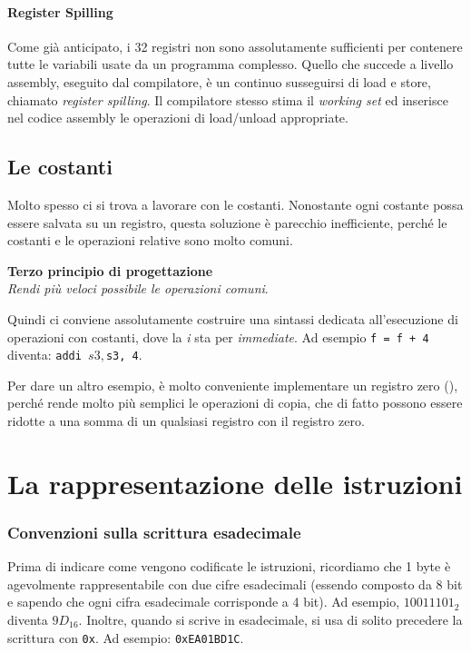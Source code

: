 \paragraph{Register Spilling}
Come già anticipato, i 32 registri non sono assolutamente sufficienti per contenere tutte le variabili usate da un programma complesso. Quello che succede a livello assembly, eseguito dal compilatore, è un continuo susseguirsi di load e store, chiamato \emph{register spilling}. Il compilatore stesso stima il \emph{working set} ed inserisce nel codice assembly le operazioni di load/unload appropriate.

\subsection*{Le costanti}
Molto spesso ci si trova a lavorare con le costanti. Nonostante ogni costante possa essere salvata su un registro, questa soluzione è parecchio inefficiente, perché le costanti e le operazioni relative sono molto comuni.

\vspace{8pt}
\begin{tcolorbox}
\centering
\textbf{Terzo principio di progettazione}\\
\emph{Rendi più veloci possibile le operazioni comuni}.
\end{tcolorbox}
\vspace{5pt}

Quindi ci conviene assolutamente costruire una sintassi dedicata all'esecuzione di operazioni con costanti, dove la \emph{i} sta per \emph{immediate}. Ad esempio \texttt{f = f + 4} diventa: \texttt{addi $s3, $s3, 4}.

Per dare un altro esempio, è molto conveniente implementare un registro zero (), perché rende molto più semplici le operazioni di copia, che di fatto possono essere ridotte a una somma di un qualsiasi registro con il registro zero.

\section{La rappresentazione delle istruzioni}

\subsubsection{Convenzioni sulla scrittura esadecimale}
Prima di indicare come vengono codificate le istruzioni, ricordiamo che 1 byte è agevolmente rappresentabile con due cifre esadecimali (essendo composto da 8 bit e sapendo che ogni cifra esadecimale corrisponde a 4 bit). Ad esempio, \(1001 1101_{2}\) diventa \(9D_{16}\). Inoltre, quando si scrive in esadecimale, si usa di solito precedere la scrittura con \texttt{0x}. Ad esempio: \texttt{0xEA01BD1C}.

